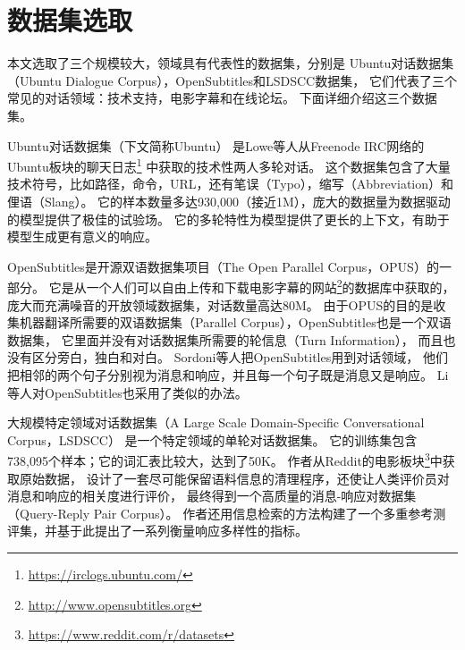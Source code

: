 \section{数据集选取}\label{sec:dataset_selection}
本文选取了三个规模较大，领域具有代表性的数据集，分别是
Ubuntu对话数据集（Ubuntu Dialogue Corpus），OpenSubtitles和LSDSCC数据集，
它们代表了三个常见的对话领域：技术支持，电影字幕和在线论坛。
下面详细介绍这三个数据集。

Ubuntu对话数据集（下文简称Ubuntu）
是Lowe等人从Freenode IRC网络的Ubuntu板块的聊天日志\footnote{\url{https://irclogs.ubuntu.com/}}
中获取的技术性两人多轮对话。
这个数据集包含了大量技术符号，比如路径，命令，URL，还有笔误（Typo），缩写（Abbreviation）和俚语（Slang）。
它的样本数量多达930,000（接近1M），庞大的数据量为数据驱动的模型提供了极佳的试验场。
它的多轮特性为模型提供了更长的上下文，有助于模型生成更有意义的响应。

OpenSubtitles是开源双语数据集项目（The Open Parallel Corpus，OPUS）的一部分。
它是从一个人们可以自由上传和下载电影字幕的网站\footnote{\url{http://www.opensubtitles.org}}的数据库中获取的，
庞大而充满噪音的开放领域数据集，对话数量高达80M。
由于OPUS的目的是收集机器翻译所需要的双语数据集（Parallel Corpus），OpenSubtitles也是一个双语数据集，
它里面并没有对话数据集所需要的轮信息（Turn Information），
而且也没有区分旁白，独白和对白。
Sordoni等人把OpenSubtitles用到对话领域，
他们把相邻的两个句子分别视为消息和响应，并且每一个句子既是消息又是响应。
Li等人对OpenSubtitles也采用了类似的办法。

大规模特定领域对话数据集（A Large Scale Domain-Specific Conversational Corpus，LSDSCC）
是一个特定领域的单轮对话数据集。
它的训练集包含738,095个样本；它的词汇表比较大，达到了50K。
作者从Reddit的电影板块\footnote{\url{https://www.reddit.com/r/datasets}}中获取原始数据，
设计了一套尽可能保留语料信息的清理程序，还使让人类评价员对消息和响应的相关度进行评价，
最终得到一个高质量的消息-响应对数据集（Query-Reply Pair Corpus）。
作者还用信息检索的方法构建了一个多重参考测评集，并基于此提出了一系列衡量响应多样性的指标。

